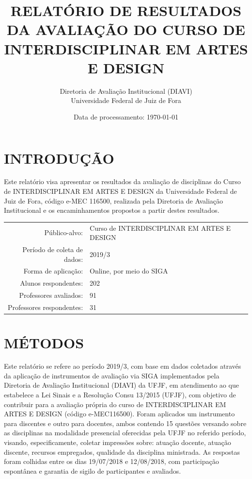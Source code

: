 \documentclass[a4paper,10pt]{article}
\date{Data de processamento: \today}
\begin{document}
\author{Diretoria de Avaliação Institucional (DIAVI) \\ Universidade Federal de Juiz de Fora}

\title{RELATÓRIO DE RESULTADOS DA AVALIAÇÃO DO CURSO DE INTERDISCIPLINAR EM ARTES E DESIGN}
\maketitle
\section{INTRODUÇÃO}
Este relatório visa apresentar os resultados da avaliação de disciplinas do Curso     de INTERDISCIPLINAR EM ARTES E DESIGN da Universidade Federal de Juiz de Fora, código e-MEC 116500, realizada pela     Diretoria de Avaliação Institucional e os encaminhamentos propostos a     partir destes resultados.

\begin{center}
\begin{tabularx}{\linewidth}{r|X}

Público-alvo:& Curso de INTERDISCIPLINAR EM ARTES E DESIGN\\

Período de coleta de dados:& 2019/3 \\

Forma de aplicação:& Online, por meio do SIGA\\

Alunos respondentes:& 202\\

Professores avaliados:& 91\\

Professores respondentes:& 31\\
\end{tabularx}
\end{center}

\section{MÉTODOS}
Este relatório se refere ao período 2019/3, com base em dados     coletados através da aplicação de instrumentos de avaliação via SIGA     implementados pela Diretoria de Avaliação Institucional (DIAVI) da UFJF, em atendimento     ao que estabelece a Lei Sinais e a Resolução Consu 13/2015 (UFJF),     com objetivo de contribuir para a avaliação própria do curso de INTERDISCIPLINAR EM ARTES E DESIGN (código e-MEC116500). Foram aplicados um instrumento para discentes e outro para docentes, ambos contendo     15 questões versando sobre as disciplinas na modalidade presencial oferecidas pela UFJF no     referido período, visando, especificamente, coletar impressões sobre: atuação docente, atuação discente,     recursos empregados, qualidade da disciplina ministrada.     As respostas foram colhidas entre os dias 19/07/2018 e 12/08/2018, com participação espontânea e garantia de    sigilo de participantes e avaliados.
\end{document}
